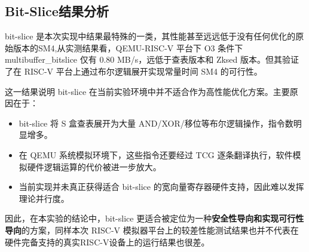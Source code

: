 \subsection{Bit-Slice结果分析}

bit-slice 是本次实现中结果最特殊的一类，其性能甚至远远低于没有任何优化的原始版本的SM4,从实测结果看，QEMU-RISC-V 平台下 O3 条件下 multibuffer\_bitslice 仅有 0.80 MB/s，远低于查表版本和 Zksed 版本。但其验证了在 RISC-V 平台上通过布尔逻辑展开实现常量时间 SM4 的可行性。

这一结果说明 bit-slice 在当前实验环境中并不适合作为高性能优化方案。主要原因在于：
\begin{itemize}
    \item [1]bit-slice 将 S 盒查表展开为大量 AND/XOR/移位等布尔逻辑操作，指令数明显增多。
    \item [2]在 QEMU 系统模拟环境下，这些指令还要经过 TCG 逐条翻译执行，软件模拟硬件逻辑运算的代价被进一步放大。
    \item [3]当前实现并未真正获得适合 bit-slice 的宽向量寄存器硬件支持，因此难以发挥理论并行度。
\end{itemize}
    

因此，在本实验的结论中，bit-slice 更适合被定位为一种\textbf{安全性导向和实现可行性导向}的方案，同样本次 RISC-V 模拟器平台上的较差性能测试结果也并不代表在硬件完备支持的真实RISC-V设备上的运行结果也很差。



